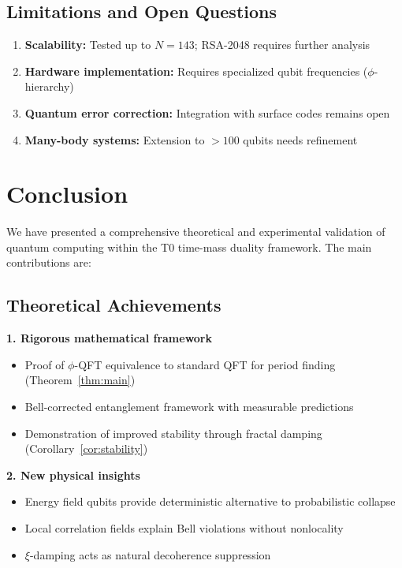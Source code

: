 \subsection{Limitations and Open Questions}

\begin{enumerate}
	\item \textbf{Scalability:} Tested up to $N=143$; RSA-2048 requires further analysis
	\item \textbf{Hardware implementation:} Requires specialized qubit frequencies ($\phi$-hierarchy)
	\item \textbf{Quantum error correction:} Integration with surface codes remains open
	\item \textbf{Many-body systems:} Extension to $>100$ qubits needs refinement
\end{enumerate}

\section{Conclusion}

We have presented a comprehensive theoretical and experimental validation of quantum computing within the T0 time-mass duality framework. The main contributions are:

\subsection{Theoretical Achievements}

\textbf{1. Rigorous mathematical framework}
\begin{itemize}
	\item Proof of $\phi$-QFT equivalence to standard QFT for period finding (Theorem~\ref{thm:main})
	\item Bell-corrected entanglement framework with measurable predictions
	\item Demonstration of improved stability through fractal damping (Corollary~\ref{cor:stability})
\end{itemize}

\textbf{2. New physical insights}
\begin{itemize}
	\item Energy field qubits provide deterministic alternative to probabilistic collapse
	\item Local correlation fields explain Bell violations without nonlocality
	\item $\xi$-damping acts as natural decoherence suppression
\end{itemize}

